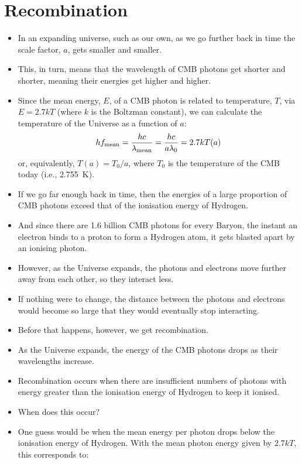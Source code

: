 \documentclass[11pt]{article}
\begin{document}
\section{Recombination}
\begin{itemize}
\item In an expanding universe, such as our own, as we go further back in time the scale factor, $a$, gets smaller and smaller.
\item This, in turn, means that the wavelength of CMB photons get shorter and shorter, meaning their energies get higher and higher.
\item Since the mean energy, $E$, of a CMB photon is related to temperature, $T$, via $E=2.7kT$ (where $k$ is the Boltzman constant), we can calculate the temperature of the Universe as a function of $a$:
\begin{equation}
    hf_{\rm mean}=\frac{hc}{\lambda_{\rm mean}}=\frac{hc}{a\lambda_0} = 2.7kT(a)
\end{equation}
or, equivalently, $T(a) = T_0/a$, where $T_0$ is the temperature of the CMB today (i.e., 2.755\ K).
\item If we go far enough back in time, then the energies of a large proportion of CMB photons exceed that of the ionisation energy of Hydrogen.
\item And since there are 1.6 billion CMB photons for every Baryon, the instant an electron binds to a proton to form a Hydrogen atom, it gets blasted apart by an ionising photon.
\item However, as the Universe expands, the photons and electrons move further away from each other, so they interact less.
\item If nothing were to change, the distance between the photons and electrons would become so large that they would eventually stop interacting.
\item Before that happens, however, we get recombination.
\item As the Universe expands, the energy of the CMB photons drops as their wavelengths increase.
\item Recombination occurs when there are insufficient numbers of photons with energy greater than the ionisation energy of Hydrogen to keep it ionised.
\item When does this occur?
\item One guess would be when the mean energy per photon drops below the ionisation energy of Hydrogen. With the mean photon energy given by $2.7kT$, this corresponds to:
\begin{equation}

\end{equation}
\end{itemize}
\end{document}
